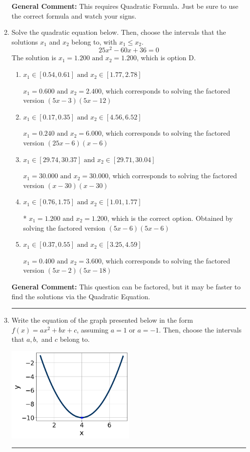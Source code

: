 \documentclass{extbook}[14pt]
\newcommand{\litem}[1]{\item #1

\rule{\textwidth}{0.4pt}}
\begin{document}
\begin{enumerate}
{\textbf{General Comment:} This requires Quadratic Formula. Just be sure to use the correct formula and watch your signs.
}
\litem{
Solve the quadratic equation below. Then, choose the intervals that the solutions $x_1$ and $x_2$ belong to, with $x_1 \leq x_2$.
\[ 25x^{2} -60 x + 36 = 0 \]The solution is \( x_1 = 1.200 \text{ and } x_2 = 1.200 \), which is option D.\begin{enumerate}[label=\Alph*.]
\item \( x_1 \in [0.54, 0.61] \text{ and } x_2 \in [1.77, 2.78] \)

$x_1 = 0.600 \text{ and } x_2 = 2.400$, which corresponds to solving the factored version $(5x -3)(5x -12)$
\item \( x_1 \in [0.17, 0.35] \text{ and } x_2 \in [4.56, 6.52] \)

$x_1 = 0.240 \text{ and } x_2 = 6.000$, which corresponds to solving the factored version $(25x -6)(x -6)$
\item \( x_1 \in [29.74, 30.37] \text{ and } x_2 \in [29.71, 30.04] \)

$x_1 = 30.000 \text{ and } x_2 = 30.000$, which corresponds to solving the factored version $(x -30)(x -30)$
\item \( x_1 \in [0.76, 1.75] \text{ and } x_2 \in [1.01, 1.77] \)

* $x_1 = 1.200 \text{ and } x_2 = 1.200$, which is the correct option. Obtained by solving the factored version $(5x -6)(5x -6)$
\item \( x_1 \in [0.37, 0.55] \text{ and } x_2 \in [3.25, 4.59] \)

$x_1 = 0.400 \text{ and } x_2 = 3.600$, which corresponds to solving the factored version $(5x -2)(5x -18)$
\end{enumerate}

\textbf{General Comment:} This question can be factored, but it may be faster to find the solutions via the Quadratic Equation.
}
\litem{
Write the equation of the graph presented below in the form $f(x)=ax^2+bx+c$, assuming  $a=1$ or $a=-1$. Then, choose the intervals that $a, b,$ and $c$ belong to.

\begin{center}
    \includegraphics[width=0.5\textwidth]{../Figures/quadraticGraphToEquationC.png}
\end{center}


}
\end{enumerate}
\end{document}
